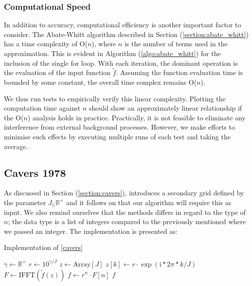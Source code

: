 \documentclass[a4paper]{report}
\begin{document}
\subsubsection{Computational Speed}\label{section:aw_speed}
In addition to accuracy, computational efficiency is another important factor to consider. The Abate-Whitt algorithm described in Section (\ref{section:abate_whitt}) has a time complexity of O($n$), where $n$ is the number of terms used in the approximation. This is evident in Algorithm (\ref{algo:abate_whitt}) for the inclusion of the single for loop. With each iteration, the dominant operation is the evaluation of the input function $\tilde{f}$. Assuming the function evaluation time is bounded by some constant, the overall time complex remains O($n$). 

We thus run tests to empirically verify this linear complexity. Plotting the computation time against $n$ should show an approximately linear relationship if the O($n$) analysis holds in practice. Practically, it is not feasible to eliminate any interference from external background processes. However, we make efforts to minimise such effects by executing multiple runs of each test and taking the average.

\subsection{Cavers 1978}
As discussed in Section (\ref{section:cavers}), \citet{Cavers1978FFT} introduces a secondary grid defined by the parameter $J_\in \mathbb{R}^+$ and it follows on that our algorithm will require this as input. We also remind ourselves that the methods differs in regard to the type of $n$; the data type is a list of integers compared to the previously mentioned where we passed an integer. The implementation is presented as:

\begin{algorithm}[H]
    \caption{Implementation of \autoref{cavers}}
    \label{algo:cavers}
    \begin{algorithmic}[1]
        	\State $\gamma \gets \mathbb{R}^+$
            \State $r \gets 10^{\gamma / J}$
            \State $z \gets \text{Array}[J]$
                \State $z[k] \gets r \cdot \exp(\text{i} * 2 \pi * k / J)$
            \EndFor
            \State $F \gets \text{IFFT}(\tilde{f}(z))$
            \State $f \gets r^n \cdot F[n]$
            \State \Return $f$ 
        \EndProcedure
    \end{algorithmic}
\end{algorithm}
\end{document}
